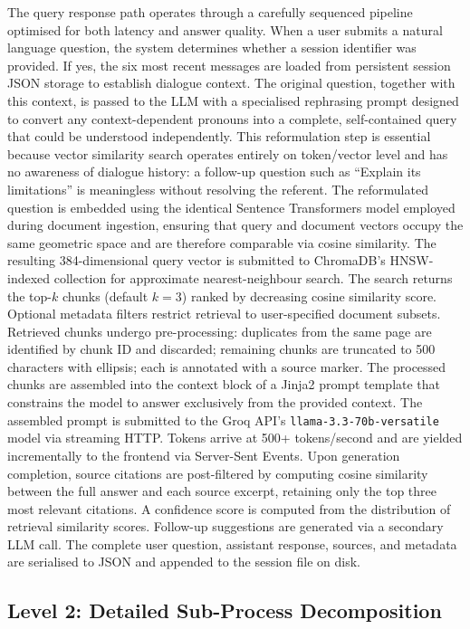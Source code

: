The query response path operates through a carefully sequenced pipeline optimised for both latency and answer quality. When a user submits a natural language question, the system determines whether a session identifier was provided. If yes, the six most recent messages are loaded from persistent session JSON storage to establish dialogue context. The original question, together with this context, is passed to the LLM with a specialised rephrasing prompt designed to convert any context-dependent pronouns into a complete, self-contained query that could be understood independently. This reformulation step is essential because vector similarity search operates entirely on token/vector level and has no awareness of dialogue history: a follow-up question such as ``Explain its limitations'' is meaningless without resolving the referent. The reformulated question is embedded using the identical Sentence Transformers model employed during document ingestion, ensuring that query and document vectors occupy the same geometric space and are therefore comparable via cosine similarity. The resulting 384-dimensional query vector is submitted to ChromaDB's HNSW-indexed collection for approximate nearest-neighbour search. The search returns the top-$k$ chunks (default $k=3$) ranked by decreasing cosine similarity score. Optional metadata filters restrict retrieval to user-specified document subsets. Retrieved chunks undergo pre-processing: duplicates from the same page are identified by chunk ID and discarded; remaining chunks are truncated to 500 characters with ellipsis; each is annotated with a source marker. The processed chunks are assembled into the context block of a Jinja2 prompt template that constrains the model to answer exclusively from the provided context. The assembled prompt is submitted to the Groq API's \texttt{llama-3.3-70b-versatile} model via streaming HTTP. Tokens arrive at 500+ tokens/second and are yielded incrementally to the frontend via Server-Sent Events. Upon generation completion, source citations are post-filtered by computing cosine similarity between the full answer and each source excerpt, retaining only the top three most relevant citations. A confidence score is computed from the distribution of retrieval similarity scores. Follow-up suggestions are generated via a secondary LLM call. The complete user question, assistant response, sources, and metadata are serialised to JSON and appended to the session file on disk.

\subsection{Level 2: Detailed Sub-Process Decomposition}

